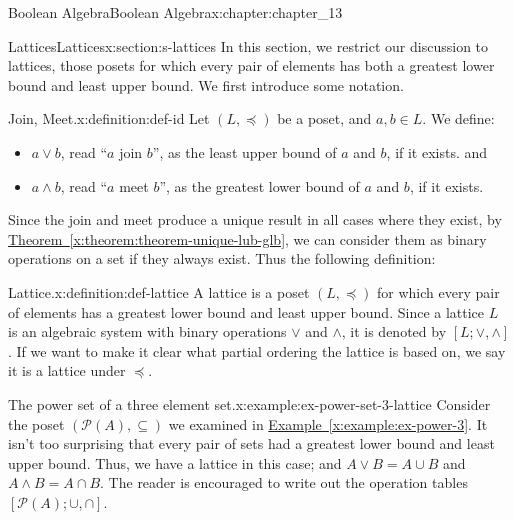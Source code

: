\documentclass[oneside,10pt,]{book}
\newcommand{\xreffont}{\relax}
\numberwithin{equation}{section}
\begin{document}
\begin{chapterptx}{Boolean Algebra}{}{Boolean Algebra}{}{}{x:chapter:chapter_13}
%
%
\typeout{************************************************}
\typeout{************************************************}
%
\begin{sectionptx}{Lattices}{}{Lattices}{}{}{x:section:s-lattices}
%
In this section, we restrict our discussion to lattices, those posets for which every pair of elements has both a greatest lower bound and least upper bound. We first introduce some notation.%
\begin{definition}{Join, Meet.}{x:definition:def-id}%
%
%
\label{g:notation:idm546613560752}%
\label{g:notation:idm546613559856}%
Let \((L, \preceq)\) be a poset, and \(a, b \in  L\). We define:%
\begin{itemize}[label=\textbullet]
\item{}\(a \lor  b\), read ``\(a\) join \(b\)'', as the least upper bound of \(a\) and \(b\), if it exists. and%
\item{}\(a \land  b\), read ``\(a\) meet \(b\)'', as the greatest lower bound of \(a\) and \(b\), if it exists.%
\end{itemize}
%
\end{definition}
Since the join and meet produce a unique result in all cases where they exist, by \hyperref[x:theorem:theorem-unique-lub-glb]{Theorem~{\xreffont\ref{x:theorem:theorem-unique-lub-glb}}}, we can consider them as binary operations on a set if they always exist.   Thus the following definition:%
\begin{definition}{Lattice.}{x:definition:def-lattice}%
%
\label{g:notation:idm546613740016}%
A lattice is a poset \((L, \preceq)\) for which every pair of elements has a greatest lower bound and least upper bound. Since a lattice \(L\) is an algebraic system with binary operations \(\lor\) and \(\land\), it is denoted by \([L; \lor, \land]\). If we want to make it clear what partial ordering the lattice is based on, we say it is a lattice under \(\preceq\).%
\end{definition}
\begin{example}{The power set of a three element set.}{x:example:ex-power-set-3-lattice}%
Consider the poset \((\mathcal{P}(A),\subseteq)\) we examined in \hyperref[x:example:ex-power-3]{Example~{\xreffont\ref{x:example:ex-power-3}}}.  It isn't too surprising that every pair of sets had a greatest lower bound and least upper bound. Thus, we have a lattice in this case; and  \(A\lor B = A \cup  B\) and \(A\land B = A \cap  B\). The reader is encouraged to write out the operation tables \([\mathcal{P}(A); \cup, \cap]\).%

\end{example}
\end{sectionptx}
\end{chapterptx}
\end{document}
